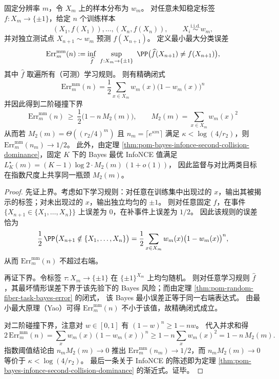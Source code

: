 \begin{theorem}[二阶碰撞作为监督与对比学习的共同指数瓶颈]\label{thm:pom-second-order-collision-common-bottleneck}
固定分辨率 \(m\)，令 \(X_m\) 上的样本分布为 \(w_m\)。
对任意未知稳定标签 \(f:X_m\to\{\pm1\}\)，给定 \(n\) 个训练样本
\[
(X_1,f(X_1)),\dots,(X_n,f(X_n)),\qquad X_i\stackrel{\mathrm{i.i.d.}}{\sim}w_m,
\]
并对独立测试点 \(X_{n+1}\sim w_m\) 预测 \(f(X_{n+1})\)。
定义最小最大分类误差
\[
\mathrm{Err}_m^{\mathrm{mm}}(n)
:=\inf_{\widehat f}\ \sup_{f:X_m\to\{\pm1\}}\ \PP\bigl(\widehat f(X_{n+1})\neq f(X_{n+1})\bigr),
\]
其中 \(\widehat f\) 取遍所有（可测）学习规则。
则有精确闭式
\[
\boxed{\;
\mathrm{Err}_m^{\mathrm{mm}}(n)
=\frac12\sum_{x\in X_m}w_m(x)\bigl(1-w_m(x)\bigr)^n\;}
\]
并因此得到二阶碰撞下界
\[
\boxed{\;
\mathrm{Err}_m^{\mathrm{mm}}(n)\ \ge\ \frac12\bigl(1-n\,M_2(m)\bigr),\qquad M_2(m)=\sum_{x\in X_m}w_m(x)^2\;}
\]
从而若 \(M_2(m)=\Theta((r_2/4)^m)\) 且 \(n_m=\lceil e^{\kappa m}\rceil\) 满足 \(\kappa<\log(4/r_2)\)，则 \(\mathrm{Err}_m^{\mathrm{mm}}(n_m)\to 1/2\)。
此外，由定理 \ref{thm:pom-bayes-infonce-second-collision-dominance}，固定 \(K\) 下的 Bayes 最优 InfoNCE 值满足
\(
L_K^\star(m)=(K-1)\log 2\cdot M_2(m)\,(1+o(1))
\)，
因此监督与对比两类目标在指数尺度上共享同一瓶颈 \(M_2(m)\)。
\end{theorem}
\begin{proof}
先证上界。考虑如下学习规则：对任意在训练集中出现过的 \(x\)，输出其被揭示的标签；对未出现过的 \(x\)，输出独立均匀的 \(\pm1\)。
则对任意固定 \(f\)，在事件 \(\{X_{n+1}\in\{X_1,\dots,X_n\}\}\) 上误差为 \(0\)，在补事件上误差为 \(1/2\)。
因此该规则的误差恰为
\[
\frac12\,\PP\bigl(X_{n+1}\notin\{X_1,\dots,X_n\}\bigr)
=\frac12\sum_{x\in X_m}w_m(x)\bigl(1-w_m(x)\bigr)^n,
\]
从而 \(\mathrm{Err}_m^{\mathrm{mm}}(n)\) 不超过右端。
\par
再证下界。令标签 \(\tau:X_m\to\{\pm1\}\) 在 \(\{\pm1\}^{X_m}\) 上均匀随机。
则对任意学习规则 \(\widehat f\)，其最坏情形误差下界于该先验下的 Bayes 风险；而由定理 \ref{thm:pom-random-fiber-task-bayes-error} 的闭式，
该 Bayes 最小误差正等于同一右端表达式。
由最小最大原理（Yao）可得 \(\mathrm{Err}_m^{\mathrm{mm}}(n)\) 不小于该值，故精确闭式成立。
\par
对二阶碰撞下界，注意对 \(w\in[0,1]\) 有 \((1-w)^n\ge 1-nw\)。
代入并求和得
\[
2\,\mathrm{Err}_m^{\mathrm{mm}}(n)=\sum_x w_m(x)(1-w_m(x))^n
\ge 1-n\sum_x w_m(x)^2
=1-n\,M_2(m).
\]
指数阈值结论由 \(n_mM_2(m)\to 0\) 推出 \(\mathrm{Err}_m^{\mathrm{mm}}(n_m)\to 1/2\)，而 \(n_mM_2(m)\to 0\) 等价于 \(\kappa<\log(4/r_2)\)。
最后一条关于 InfoNCE 的陈述即为定理 \ref{thm:pom-bayes-infonce-second-collision-dominance} 的渐近式。证毕。
\end{proof}

